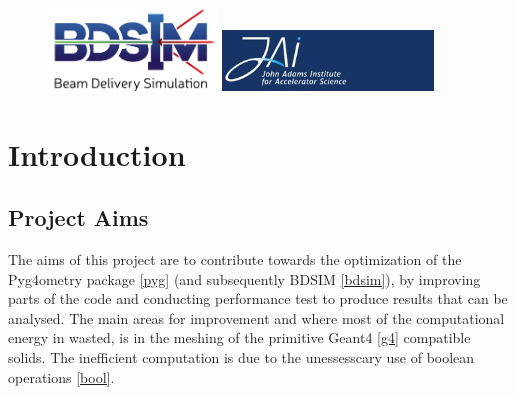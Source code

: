\documentclass[12pt,a4paper]{article}
\begin{document}
\begin{titlepage}
\begin{figure}[h]
\centering
\begin{minipage}{.6\textwidth}
  \includegraphics[width=0.4\textwidth]{Images//Logos//BDSIM_Logo.jpg}
\end{minipage}%
\begin{minipage}{.6\textwidth}
  \centering
  \includegraphics[width=0.5\textwidth]{Images//Logos//JAI_Logo.jpeg}
  \end{minipage}
\end{figure}

\end{titlepage}
\leavevmode\thispagestyle{empty}\newpage
\tableofcontents
\thispagestyle{empty}
\newpage
\onecolumn

\small
\setcounter{page}{1}


\section{Introduction}

\subsection{Project Aims}
The aims of this project are to contribute towards the optimization of the Pyg4ometry package \ref{pyg} (and subsequently BDSIM \ref{bdsim}), by improving parts of the code and conducting performance test to produce results that can be analysed. The main areas for improvement and where most of the computational energy in wasted, is in the meshing of the primitive Geant4 \ref{g4} compatible solids. The inefficient computation is due to the unessesscary use of boolean operations \ref{bool}.
\end{document}
